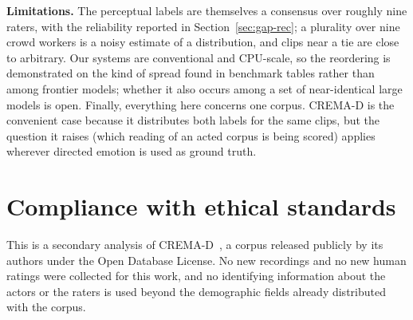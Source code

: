 \documentclass{article}
\begin{document}
\textbf{Limitations.} The perceptual labels are themselves a consensus over
roughly nine raters, with the reliability reported in
Section~\ref{sec:gap-rec}; a plurality over nine crowd workers is a noisy
estimate of a distribution, and clips near a tie are close to arbitrary. Our
systems are conventional and CPU-scale, so the reordering is demonstrated on the
kind of spread found in benchmark tables rather than among frontier models;
whether it also occurs among a set of near-identical large models is open.
Finally, everything here concerns one corpus. CREMA-D is the convenient case
because it distributes both labels for the same clips, but the question it
raises (which reading of an acted corpus is being scored) applies wherever
directed emotion is used as ground truth.

\vfill\pagebreak

\section*{Compliance with ethical standards}

This is a secondary analysis of CREMA-D~\cite{cao2014cremad}, a corpus released
publicly by its authors under the Open Database License. No new recordings and
no new human ratings were collected for this work, and no identifying
information about the actors or the raters is used beyond the demographic fields
already distributed with the corpus.



\end{document}

